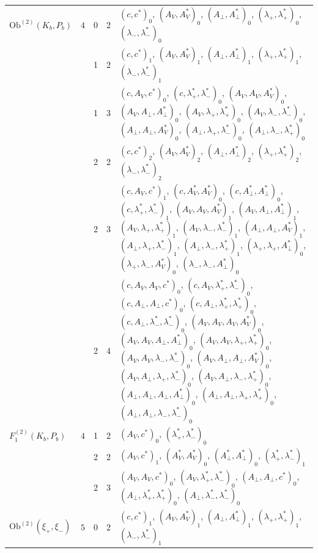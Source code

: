 \documentclass[11pt]{article}
\numberwithin{equation}{section}
\theoremstyle{plain}
\theoremstyle{definition}
\newcommand{\Ob}{\mathrm{Ob}}
\begin{document}
{\begin{longtable}{>{\raggedright}p{2.3cm}|p{0.6cm}|p{0.25cm}|p{0.25cm}|>{\raggedright\arraybackslash}p{11.6cm}}
\hline
$\Ob^{(2)}(K_b,P_b)$ & $4$ & 0 & 2 & $(c,c^*)_{0}$, $(A_V,A^*_V)_{0}$, $(A_\perp,A^*_\perp)_{0}$, $(\lambda_+,\lambda^*_+)_{0}$, $(\lambda_-,\lambda^*_-)_{0}$ \\
 &  & 1 & 2 & $(c,c^*)_{1}$, $(A_V,A^*_V)_{1}$, $(A_\perp,A^*_\perp)_{1}$, $(\lambda_+,\lambda^*_+)_{1}$, $(\lambda_-,\lambda^*_-)_{1}$ \\
 &  & 1 & 3 & $(c,A_V,c^*)_{0}$, $(c,\lambda^*_+,\lambda^*_-)_{0}$, $(A_V,A_V,A^*_V)_{0}$, $(A_V,A_\perp,A^*_\perp)_{0}$, $(A_V,\lambda_+,\lambda^*_+)_{0}$, $(A_V,\lambda_-,\lambda^*_-)_{0}$, $(A_\perp,A_\perp,A^*_V)_{0}$, $(A_\perp,\lambda_+,\lambda^*_-)_{0}$, $(A_\perp,\lambda_-,\lambda^*_+)_{0}$ \\
 &  & 2 & 2 & $(c,c^*)_{2}$, $(A_V,A^*_V)_{2}$, $(A_\perp,A^*_\perp)_{2}$, $(\lambda_+,\lambda^*_+)_{2}$, $(\lambda_-,\lambda^*_-)_{2}$ \\
 &  & 2 & 3 & $(c,A_V,c^*)_{1}$, $(c,A^*_V,A^*_V)_{0}$, $(c,A^*_\perp,A^*_\perp)_{0}$, $(c,\lambda^*_+,\lambda^*_-)_{1}$, $(A_V,A_V,A^*_V)_{1}$, $(A_V,A_\perp,A^*_\perp)_{1}$, $(A_V,\lambda_+,\lambda^*_+)_{1}$, $(A_V,\lambda_-,\lambda^*_-)_{1}$, $(A_\perp,A_\perp,A^*_V)_{1}$, $(A_\perp,\lambda_+,\lambda^*_-)_{1}$, $(A_\perp,\lambda_-,\lambda^*_+)_{1}$, $(\lambda_+,\lambda_+,A^*_\perp)_{0}$, $(\lambda_+,\lambda_-,A^*_V)_{0}$, $(\lambda_-,\lambda_-,A^*_\perp)_{0}$ \\
 &  & 2 & 4 & $(c,A_V,A_V,c^*)_{0}$, $(c,A_V,\lambda^*_+,\lambda^*_-)_{0}$, $(c,A_\perp,A_\perp,c^*)_{0}$, $(c,A_\perp,\lambda^*_+,\lambda^*_+)_{0}$, $(c,A_\perp,\lambda^*_-,\lambda^*_-)_{0}$, $(A_V,A_V,A_V,A^*_V)_{0}$, $(A_V,A_V,A_\perp,A^*_\perp)_{0}$, $(A_V,A_V,\lambda_+,\lambda^*_+)_{0}$, $(A_V,A_V,\lambda_-,\lambda^*_-)_{0}$, $(A_V,A_\perp,A_\perp,A^*_V)_{0}$, $(A_V,A_\perp,\lambda_+,\lambda^*_-)_{0}$, $(A_V,A_\perp,\lambda_-,\lambda^*_+)_{0}$, $(A_\perp,A_\perp,A_\perp,A^*_\perp)_{0}$, $(A_\perp,A_\perp,\lambda_+,\lambda^*_+)_{0}$, $(A_\perp,A_\perp,\lambda_-,\lambda^*_-)_{0}$ \\
\hline
$F_1^{(2)}(K_b,P_b)$ & $4$ & 1 & 2 & $(A_V,c^*)_{0}$, $(\lambda^*_+,\lambda^*_-)_{0}$ \\
 &  & 2 & 2 & $(A_V,c^*)_{1}$, $(A^*_V,A^*_V)_{0}$, $(A^*_\perp,A^*_\perp)_{0}$, $(\lambda^*_+,\lambda^*_-)_{1}$ \\
 &  & 2 & 3 & $(A_V,A_V,c^*)_{0}$, $(A_V,\lambda^*_+,\lambda^*_-)_{0}$, $(A_\perp,A_\perp,c^*)_{0}$, $(A_\perp,\lambda^*_+,\lambda^*_+)_{0}$, $(A_\perp,\lambda^*_-,\lambda^*_-)_{0}$ \\
\hline
$\Ob^{(2)}(\xi_+,\xi_-)$ & $5$ & 0 & 2 & $(c,c^*)_{1}$, $(A_V,A^*_V)_{1}$, $(A_\perp,A^*_\perp)_{1}$, $(\lambda_+,\lambda^*_+)_{1}$, $(\lambda_-,\lambda^*_-)_{1}$ \\

\end{longtable}}
\end{document}

